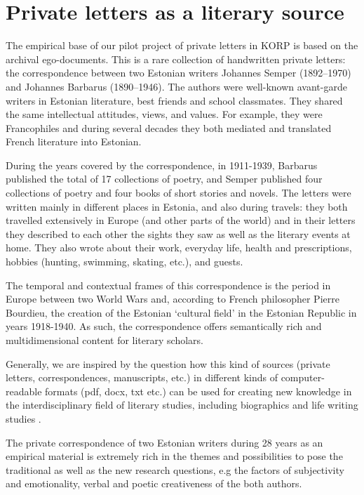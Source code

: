 \documentclass[runningheads]{llncs}
\begin{document}
\section{Private letters as a literary source}

The empirical base of our pilot project of private letters in KORP is based on the archival ego-documents. This is a rare collection of handwritten private letters: the correspondence between two Estonian writers Johannes Semper (1892–1970) and Johannes Barbarus (1890–1946). The authors were well-known avant-garde writers in Estonian literature, best friends and school classmates. They shared the same intellectual attitudes, views, and values. For example, they were Francophiles and during several decades they both mediated and translated French literature into Estonian. 

During the years covered by the correspondence, in 1911-1939, Barbarus published the total of 17 collections of poetry, and Semper published four collections of poetry and four books of short stories and novels. The letters were written mainly in different places in Estonia, and also during travels: they both travelled extensively in Europe (and other parts of the world) and in their letters they described to each other the sights they saw as well as the literary events at home. They also wrote about their work, everyday life, health and prescriptions, hobbies (hunting, swimming, skating, etc.), and guests. 

The temporal and contextual frames of this correspondence is the period in Europe between two World Wars and, according to French philosopher Pierre Bourdieu, the creation of  the Estonian ‘cultural field’ in the Estonian Republic in years 1918-1940. As such, the correspondence offers semantically rich and multidimensional content for literary scholars.  

Generally, we are inspired by the question how this kind of sources (private letters, correspondences, manuscripts, etc.) in different kinds of computer-readable formats (pdf, docx, txt etc.) can be used for creating new knowledge in the interdisciplinary field of literary studies, including biographics and life writing studies \cite{2015}. 

The private correspondence of two Estonian writers during 28 years as an empirical material is extremely rich in the themes and possibilities to pose the traditional as well as the new research questions, e.g the factors of subjectivity and emotionality, verbal and poetic creativeness of the both authors.  
\end{document}
